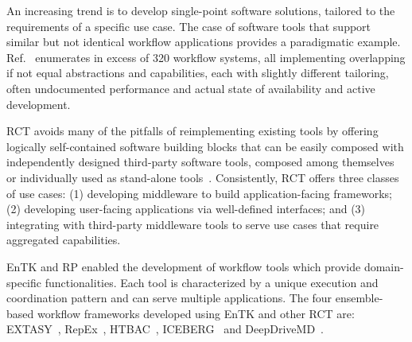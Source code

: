 \documentclass[preprint,12pt, a4paper]{elsarticle}
\begin{document}


An increasing trend is to develop single-point software solutions, tailored to
the requirements of a specific use case. The case of software tools that support
similar but not identical workflow applications provides a paradigmatic example.
Ref.~\cite{workflow-systems-url} enumerates in excess of 320 workflow systems,
all implementing overlapping if not equal abstractions and capabilities, each
with slightly different tailoring, often undocumented performance and actual
state of availability and active development.

RCT avoids many of the pitfalls of reimplementing existing tools by offering
logically self-contained software building blocks that can be easily composed
with independently designed third-party software tools, composed among
themselves or individually used as stand-alone
tools~\cite{turilli2019middleware}. Consistently, RCT offers three classes
of use cases: (1) developing middleware to build application-facing
frameworks; (2) developing user-facing applications via well-defined interfaces; and (3) integrating with third-party middleware tools to serve use cases that require aggregated capabilities.


EnTK and RP enabled the development of workflow tools which provide
domain-specific functionalities. Each tool is characterized by a unique
execution and coordination pattern and can serve multiple applications. The four
ensemble-based workflow frameworks developed using EnTK and other RCT are:
EXTASY~\cite{balasubramanian2016extasy}, RepEx~\cite{treikalis2016repex},
HTBAC~\cite{dakka2018high}, ICEBERG~\cite{iceberg_paper} and
DeepDriveMD~\cite{lee2019deepdrivemd}.

\end{document}

